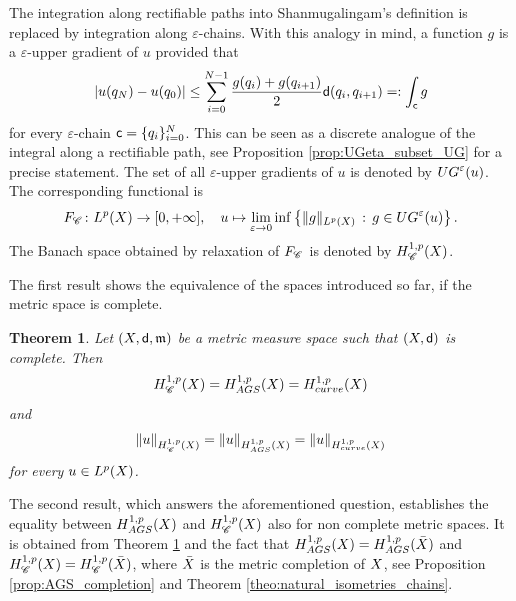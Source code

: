 \documentclass[12pt]{amsart}
\newcommand{\sfd}{{\sf d}}
\newcommand{\X}{{\rm X}}
\newcommand{\mm}{\mathfrak m}
\newcommand{\F}{{\rm F}}
\newtheorem{theorem}{Theorem}[section]
\theoremstyle{definition}
\newcommand{\sfc}{{\sf c}}
\newcommand{\Chain}[1]{\mathscr{C}^{#1}}
\newcommand{\UG}[1]{{\rm UG}^{#1}}
\newcommand{\HH}[2]{H^{1,#1}_{{\rm #2}}}
\renewcommand{\F}[1]{{\rm F}_{{\rm #1}}}
\begin{document}
The integration along rectifiable paths into Shanmugalingam's definition is replaced by integration along $\varepsilon$-chains. With this analogy in mind, a function $g$ is a $\varepsilon$-upper gradient of $u$ provided that
\begin{equation*}
    |u(q_N)-u(q_0)| \le \sum_{i=0}^{N-1}\frac{g(q_i) + g(q_{i+1})}{2}\sfd(q_i,q_{i+1}) =:\int_{\sfc} g
\end{equation*}
for every $\varepsilon$-chain $\sfc = \{q_i\}_{i=0}^N$. This can be seen as a discrete analogue of the integral along a rectifiable path, see Proposition \ref{prop:UGeta_subset_UG} for a precise statement. The set of all $\varepsilon$-upper gradients of $u$ is denoted by $\UG{\varepsilon}(u)$. 
The corresponding functional is
\begin{equation}
        \F{\Chain{}} \colon L^{p}(\X) \to  [0,+\infty], \quad u \mapsto \lim_{\varepsilon \to 0} \inf\left\{ \| g \|_{L^p(\X)}\,:\, g\in \UG{\varepsilon}(u)\right\}.
\end{equation}
The Banach space obtained by relaxation of $\F{\Chain{}}$ is denoted by $\HH{p}{\Chain{}}(\X)$.

The first result shows the equivalence of the spaces introduced so far, if the metric space is complete.

\begin{theorem}
\label{theo-intro:equivalences-of-all-norms-complete-spaces}
    Let $(\X,\sfd,\mm)$ be a metric measure space such that $(\X,\sfd)$ is complete. Then
    \begin{equation}
        \HH{p}{\Chain{}}(\X) = \HH{p}{AGS}(\X) = \HH{p}{curve}(\X)
    \end{equation}
    and
    \begin{equation}
        \|u \|_{\HH{p}{\Chain{}}(\X)} = \|u \|_{\HH{p}{AGS}(\X)} = \|u \|_{\HH{p}{curve}(\X)}
    \end{equation}
    for every $u\in L^p(\X)$.
\end{theorem}

The second result, which answers the aforementioned question, establishes the equality between $\HH{p}{AGS}(\X)$ and $\HH{p}{\Chain{}}(\X)$ also for non complete metric spaces. It is obtained from Theorem \ref{theo-intro:equivalences-of-all-norms-complete-spaces} and the fact that $\HH{p}{AGS}(\X)=\HH{p}{AGS}(\bar{\X})$ and $\HH{p}{\Chain{}}(\X)=\HH{p}{\Chain{}}(\bar{\X})$, where $\bar{\X}$ is the metric completion of $\X$, see Proposition \ref{prop:AGS_completion} and Theorem \ref{theo:natural_isometries_chains}.
\end{document}
